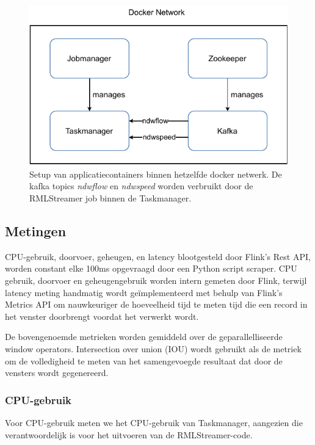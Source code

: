 \begin{figure}[htpb]
    \centering
    \includegraphics[width=\columnwidth]{fig/docker_setup.pdf}
    \caption[Setup of application containers inside the same docker network.]{ 
Setup van applicatiecontainers binnen hetzelfde docker netwerk.
De kafka topics \emph{ndwflow} en \emph{ndwspeed} worden verbruikt door de 
RMLStreamer job binnen de Taskmanager.}
    \label{fig:docker_setup}
\end{figure}

\subsection{Metingen}%
\label{sub:Metrics measurement}

CPU-gebruik, doorvoer, geheugen, en latency blootgesteld 
door Flink's Rest API, worden constant elke 100ms opgevraagd door een 
Python script scraper.
CPU gebruik, doorvoer 
en geheugengebruik worden intern gemeten door Flink,
terwijl latency meting 
handmatig wordt ge\"implementeerd met behulp van Flink's Metrics API om nauwkeuriger de hoeveelheid tijd te meten 
tijd die een record in het venster doorbrengt voordat het verwerkt wordt. 

De bovengenoemde metrieken worden gemiddeld over de geparallelliseerde window operators.
Intersection over union (IOU) wordt gebruikt als de metriek om de volledigheid te meten
van het samengevoegde resultaat dat door de vensters wordt gegenereerd.  


\subsubsection{CPU-gebruik}%
\label{ssub:CPU usage}
Voor CPU-gebruik meten we het CPU-gebruik van Taskmanager, aangezien die 
verantwoordelijk is voor het uitvoeren van de RMLStreamer-code. 

